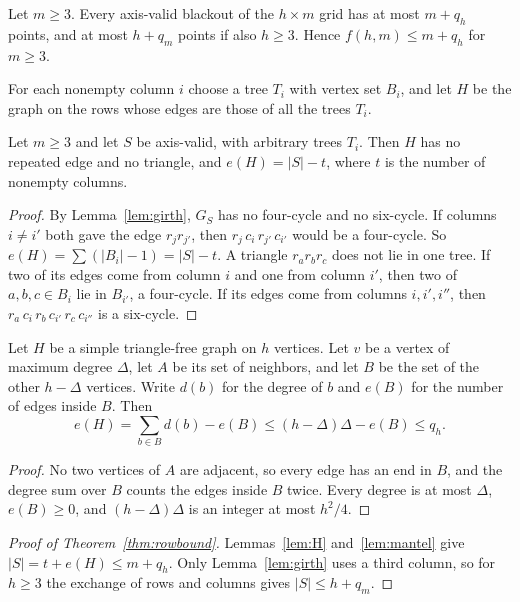\begin{theorem}\label{thm:rowbound}
Let $m\ge3$. Every axis-valid blackout of the $h\times m$ grid has at most $m+q_h$ points, and at most $h+q_m$ points if also $h\ge3$. Hence $f(h,m)\le m+q_h$ for $m\ge3$.
\end{theorem}

For each nonempty column $i$ choose a tree $T_i$ with vertex set $B_i$, and let $H$ be the graph on the rows whose edges are those of all the trees $T_i$.

\begin{lemma}\label{lem:H}
Let $m\ge3$ and let $S$ be axis-valid, with arbitrary trees $T_i$. Then $H$ has no repeated edge and no triangle, and $e(H)=|S|-t$, where $t$ is the number of nonempty columns.
\end{lemma}

\begin{proof}
By Lemma~\ref{lem:girth}, $G_S$ has no four-cycle and no six-cycle. If columns $i\ne i'$ both gave the edge $r_jr_{j'}$, then $r_j\,c_i\,r_{j'}\,c_{i'}$ would be a four-cycle. So $e(H)=\sum(|B_i|-1)=|S|-t$. A triangle $r_ar_br_c$ does not lie in one tree. If two of its edges come from column $i$ and one from column $i'$, then two of $a,b,c\in B_i$ lie in $B_{i'}$, a four-cycle. If its edges come from columns $i,i',i''$, then $r_a\,c_i\,r_b\,c_{i'}\,r_c\,c_{i''}$ is a six-cycle.
\end{proof}

\begin{lemma}\label{lem:mantel}
Let $H$ be a simple triangle-free graph on $h$ vertices. Let $v$ be a vertex of maximum degree $\Delta$, let $A$ be its set of neighbors, and let $B$ be the set of the other $h-\Delta$ vertices. Write $d(b)$ for the degree of $b$ and $e(B)$ for the number of edges inside $B$. Then
\[
e(H)=\sum_{b\in B}d(b)-e(B)\le(h-\Delta)\Delta-e(B)\le q_h.
\]
\end{lemma}

\begin{proof}
No two vertices of $A$ are adjacent, so every edge has an end in $B$, and the degree sum over $B$ counts the edges inside $B$ twice. Every degree is at most $\Delta$, $e(B)\ge0$, and $(h-\Delta)\Delta$ is an integer at most $h^2/4$.
\end{proof}

\begin{proof}[Proof of Theorem~\ref{thm:rowbound}]
Lemmas~\ref{lem:H} and~\ref{lem:mantel} give $|S|=t+e(H)\le m+q_h$. Only Lemma~\ref{lem:girth} uses a third column, so for $h\ge3$ the exchange of rows and columns gives $|S|\le h+q_m$.
\end{proof}

